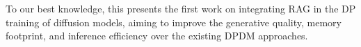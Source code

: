 To our best knowledge, this presents the first work on integrating RAG in the DP training of diffusion models, aiming to improve the generative quality, memory footprint, and inference efficiency over the existing DPDM approaches. 




